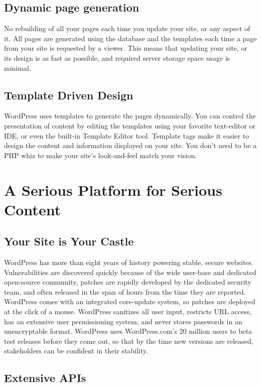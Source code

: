 \subsection{Dynamic page generation}

No rebuilding of all your pages each time you update your site, or any aspect of it. All pages are generated using the database and the templates each time a page from your site is requested by a viewer. This means that updating your site, or its design is as fast as possible, and required server storage space usage is minimal.

\subsection{Template Driven Design}

WordPress uses templates to generate the pages dynamically. You can control the presentation of content by editing the templates using your favorite text-editor or IDE, or even the built-in Template Editor tool. Template tags make it easier to design the content and information displayed on your site. You don't need to be a PHP whiz to make your site's look-and-feel match your vision.


\section{A Serious Platform for Serious Content}

\subsection{Your Site is Your Castle}
 
WordPress has more than eight years of history powering stable, secure websites. Vulnerabilities are discovered quickly because of the wide user-base and dedicated open-source community, patches are rapidly developed by the dedicated security team, and often released in the span of hours from the time they are reported. WordPress comes with an integrated core-update system, so patches are deployed at the click of a mouse. WordPress sanitizes all user input, restricts URL access, has an extensive user permissioning system, and never stores passwords in an unencryptable format. WordPress uses WordPress.com’s 20 million users to beta test releases before they come out, so that by the time new versions are released, stakeholders can be confident in their stability.

\subsection{Extensive APIs}

